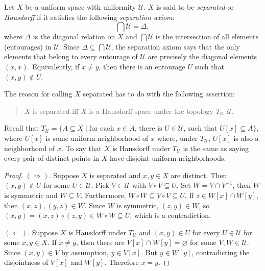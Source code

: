 \documentclass[12pt]{article}
\begin{document}

Let $X$ be a uniform space with uniformity $\mathcal{U}$.  $X$ is said to be \emph{separated} or \emph{Hausdorff} if it satisfies the following \emph{separation axiom}:
$$\bigcap \mathcal{U}=\Delta,$$
where $\Delta$ is the diagonal relation on $X$ and $\bigcap \mathcal{U}$ is the intersection of all elements (entourages) in $\mathcal{U}$.  Since $\Delta\subseteq \bigcap \mathcal{U}$, the separation axiom says that the only elements that belong to every entourage of $\mathcal{U}$ are precisely the diagonal elements $(x,x)$.  Equivalently, if $x\ne y$, then there is an entourage $U$ such that $(x,y)\notin U$.

The reason for calling $X$ separated has to do with the following assertion:
\begin{quote}
$X$ is separated iff $X$ is a Hausdorff space under the topology $T_{\mathcal{U}}$  $\mathcal{U}$.
\end{quote}

Recall that $T_{\mathcal{U}}=\lbrace A\subseteq X\mid \mbox{for each }x\in A\mbox{, there is }U\in \mathcal{U}\mbox{, such that }U[x]\subseteq A\rbrace$, where $U[x]$ is some uniform neighborhood of $x$ where, under $T_{\mathcal{U}}$, $U[x]$ is also a neighborhood of $x$.  To say that $X$ is Hausdorff under $T_{\mathcal{U}}$ is the same as saying every pair of distinct points in $X$ have disjoint uniform neighborhoods.

\begin{proof}
$(\Rightarrow)$.  Suppose $X$ is separated and $x,y\in X$ are distinct.  Then $(x,y)\notin U$ for some $U\in \mathcal{U}$.  Pick $V\in \mathcal{U}$ with $V\circ V\subseteq U$.  Set $W=V\cap V^{-1}$, then $W$ is symmetric and $W\subseteq V$.  Furthermore, $W\circ W\subseteq V\circ V\subseteq U$.  If $z\in W[x]\cap W[y]$, then $(x,z),(y,z)\in W$.  Since $W$ is symmetric, $(z,y)\in W$, so $(x,y)=(x,z)\circ (z,y)\in W\circ W\subseteq U$, which is a contradiction.

$(\Leftarrow)$.  Suppose $X$ is Hausdorff under $T_{\mathcal{U}}$ and $(x,y)\in U$ for every $U\in \mathcal{U}$ for some $x,y\in X$.  If $x\ne y$, then there are $V[x]\cap W[y]=\varnothing$ for some $V,W\in \mathcal{U}$.  Since $(x,y)\in V$ by assumption, $y\in V[x]$.  But $y\in W[y]$, contradicting the disjointness of $V[x]$ and $W[y]$.  Therefore $x=y$.
\end{proof}
\end{document}
